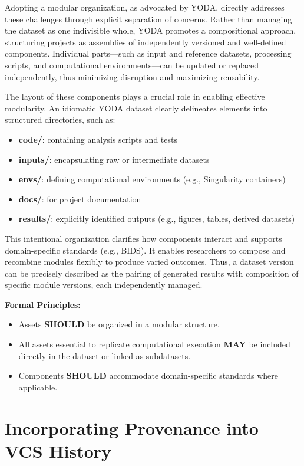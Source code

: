 \documentclass{article}
\begin{document}
Adopting a modular organization, as advocated by YODA, directly addresses these challenges through explicit separation of concerns.
Rather than managing the dataset as one indivisible whole, YODA promotes a compositional approach, structuring projects as assemblies of independently versioned and well-defined components.
Individual parts—such as input and reference datasets, processing scripts, and computational environments—can be updated or replaced independently, thus minimizing disruption and maximizing reusability.

The layout of these components plays a crucial role in enabling effective modularity.
An idiomatic YODA dataset clearly delineates elements into structured directories, such as:

\begin{itemize}
  \item \textbf{code/}: containing analysis scripts and tests
  \item \textbf{inputs/}: encapsulating raw or intermediate datasets
  \item \textbf{envs/}: defining computational environments (e.g., Singularity containers)
  \item \textbf{docs/}: for project documentation
  \item \textbf{results/}: explicitly identified outputs (e.g., figures, tables, derived datasets)
\end{itemize}

This intentional organization clarifies how components interact and supports domain-specific standards (e.g., BIDS).
It enables researchers to compose and recombine modules flexibly to produce varied outcomes.
Thus, a dataset version can be precisely described as the pairing of generated results with composition of specific module versions, each independently managed.

\textbf{Formal Principles:}

\begin{itemize}
  \item Assets \textbf{SHOULD} be organized in a modular structure.
  \item All assets essential to replicate computational execution \textbf{MAY} be included directly in the dataset or linked as subdatasets.
  \item Components \textbf{SHOULD} accommodate domain-specific standards where applicable.
\end{itemize}

\section{Incorporating Provenance into VCS History}
\end{document}

